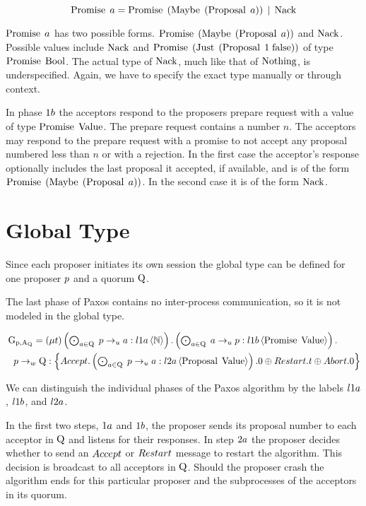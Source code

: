 \[\operatorname{Promise}\; a = \operatorname{Promise}\; \left(\operatorname{Maybe}\; \left(\operatorname{Proposal}\; a\right)\right) \; | \; \operatorname{Nack}\]

$\operatorname{Promise}\; a$ has two possible forms.
$\operatorname{Promise}\; \left(\operatorname{Maybe}\; \left(\operatorname{Proposal}\; a\right)\right)$ and $\operatorname{Nack}$.
Possible values include $\operatorname{Nack}$ and $\operatorname{Promise}\; \left(\operatorname{Just}\; \left(\operatorname{Proposal}\; 1\; {\operatorname{false}}\right)\right)$ of type $\operatorname{Promise}\; \mathbb{\operatorname{Bool}}$.
The actual type of $\operatorname{Nack}$, much like that of $\operatorname{Nothing}$, is underspecified.
Again, we have to specify the exact type manually or through context.

In phase $1b$ the acceptors respond to the proposers prepare request with a value of type $\operatorname{Promise}\; \operatorname{Value}$.
The prepare request contains a number $n$.
The acceptors may respond to the prepare request with a promise to not accept any proposal numbered less than $n$ or with a rejection.
In the first case the acceptor's response optionally includes the last proposal it accepted, if available, and is of the form $\operatorname{Promise}\; \left(\operatorname{Maybe}\; \left(\operatorname{Proposal}\; a\right)\right)$.
In the second case it is of the form $\operatorname{Nack}$.

\section{Global Type}
Since each proposer initiates its own session the global type can be defined for one proposer $p$ and a quorum $\operatorname{Q}$.

The last phase of Paxos contains no inter-process communication, so it is not modeled in the global type.

\begin{align*}
&\operatorname{G_{p, A_Q}} = \left(\mu t\right)
\textstyle\left(\bigodot_{a \in \operatorname{Q}}\;p \to_u a : l1a \left\langle \mathbb{N} \right\rangle\right) .
\textstyle\left(\bigodot_{a \in \operatorname{Q}}\;a \to_u p : l1b \left\langle \operatorname{Promise}\; \operatorname{Value} \right\rangle\right) .\\
&\hspace*{0.75em * 1}p \to_w \operatorname{Q} : \left\{
\mathnormal{Accept}.\textstyle\left(\bigodot_{a \in \operatorname{Q}}\;p \to_u a : l2a \left\langle \operatorname{Proposal}\; \operatorname{Value} \right\rangle\right).0 \oplus
\mathnormal{Restart}.t \oplus
\mathnormal{Abort}.0\right\}
\end{align*}

We can distinguish the individual phases of the Paxos algorithm by the labels $l1a$, $l1b$, and $l2a$.

In the first two steps, $1a$ and $1b$, the proposer sends its proposal number to each acceptor in $\operatorname{Q}$ and listens for their responses.
In step $2a$ the proposer decides whether to send an $\mathnormal{Accept}$ or $\mathnormal{Restart}$ message to restart the algorithm.
This decision is broadcast to all acceptors in $\operatorname{Q}$.
Should the proposer crash the algorithm ends for this particular proposer and the subprocesses of the acceptors in its quorum.

